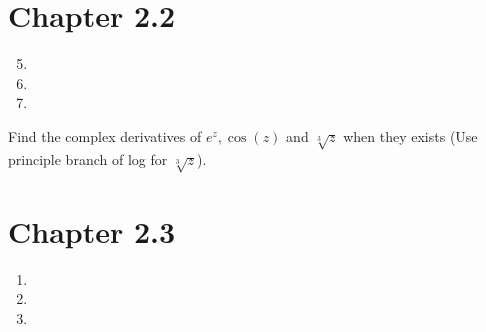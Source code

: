 \documentclass{article}
\newcommand{\Chapter}[1]{\section*{Chapter #1}}
\begin{document}
\Chapter{2.2}
\begin{enumerate}[1.]
\setcounter{enumi}{4}
\item

\item 

\setcounter{enumi}{13}
\item 
\end{enumerate}

Find the complex derivatives of $e^z, \cos(z)$ and $\sqrt[3]{z}$ when they
exists (Use principle branch of log for $\sqrt[3]{z}$).

\Chapter{2.3}
\begin{enumerate}[1.]
\item

\item

\item
\end{enumerate}
\end{document}
